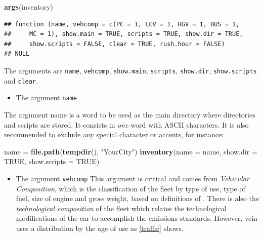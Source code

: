 \documentclass[12pt,graybox,envcountchap,sectrefs]{krantz}
\makeatletter
\newenvironment{Shaded}{\begin{snugshade}}{\end{snugshade}}
\newcommand{\KeywordTok}[1]{\textcolor[rgb]{0.13,0.29,0.53}{\textbf{#1}}}
\newcommand{\DataTypeTok}[1]{\textcolor[rgb]{0.13,0.29,0.53}{#1}}
\newcommand{\StringTok}[1]{\textcolor[rgb]{0.31,0.60,0.02}{#1}}
\newcommand{\OtherTok}[1]{\textcolor[rgb]{0.56,0.35,0.01}{#1}}
\newcommand{\NormalTok}[1]{#1}
\providecommand{\tightlist}{%
  \setlength{\itemsep}{0pt}\setlength{\parskip}{0pt}}
\newenvironment{kframe}{%
\medskip{}
\setlength{\fboxsep}{.8em}
 \def\at@end@of@kframe{}%
 \ifinner\ifhmode%
  \def\at@end@of@kframe{\end{minipage}}%
  \begin{minipage}{\columnwidth}%
 \fi\fi%
 \def\FrameCommand##1{\hskip\@totalleftmargin \hskip-\fboxsep
 \colorbox{shadecolor}{##1}\hskip-\fboxsep
     \hskip-\linewidth \hskip-\@totalleftmargin \hskip\columnwidth}%
 \MakeFramed {\advance\hsize-\width
   \@totalleftmargin\z@ \linewidth\hsize
   \@setminipage}}%
 {\par\unskip\endMakeFramed%
 \at@end@of@kframe}
\renewenvironment{Shaded}{\begin{kframe}}{\end{kframe}}
\theoremstyle{definition}
\theoremstyle{definition}
\theoremstyle{definition}
\theoremstyle{remark}
\makeatother
\begin{document}
\begin{Shaded}
\begin{Highlighting}[]
\KeywordTok{args}\NormalTok{(inventory)}
\end{Highlighting}
\end{Shaded}

\begin{verbatim}
## function (name, vehcomp = c(PC = 1, LCV = 1, HGV = 1, BUS = 1, 
##     MC = 1), show.main = TRUE, scripts = TRUE, show.dir = TRUE, 
##     show.scripts = FALSE, clear = TRUE, rush.hour = FALSE) 
## NULL
\end{verbatim}

The arguments are \texttt{name}, \texttt{vehcomp}, \texttt{show.main},
\texttt{scripts}, \texttt{show.dir}, \texttt{show.scripts} and
\texttt{clear}.

\begin{itemize}
\tightlist
\item
  The argument \texttt{name}
\end{itemize}

The argument name is a word to be used as the main directory where
directories and scripts are stored. It consists in \emph{one} word with
ASCII characters. It is also recommended to exclude any special
character or accents, for instance:

\begin{Shaded}
\begin{Highlighting}[]
\NormalTok{name =}\StringTok{ }\KeywordTok{file.path}\NormalTok{(}\KeywordTok{tempdir}\NormalTok{(), }\StringTok{"YourCity"}\NormalTok{)}
\KeywordTok{inventory}\NormalTok{(}\DataTypeTok{name =}\NormalTok{ name,  }\DataTypeTok{show.dir =} \OtherTok{TRUE}\NormalTok{, }\DataTypeTok{show.scripts =} \OtherTok{TRUE}\NormalTok{)}
\end{Highlighting}
\end{Shaded}

\begin{itemize}
\tightlist
\item
  The argument \texttt{vehcomp} This argument is critical and comes from
  \emph{Vehicular Composition}, which is the classification of the fleet
  by type of use, type of fuel, size of engine and gross weight, based
  on definitions of \citet{Corvalanetal2002}. There is also the
  \emph{technological composition} of the fleet which relates the
  technological modifications of the car to accomplish the emissions
  standards. However, vein uses a distribution by the age of use as
  \ref{traffic} shows.
\end{itemize}
\end{document}
